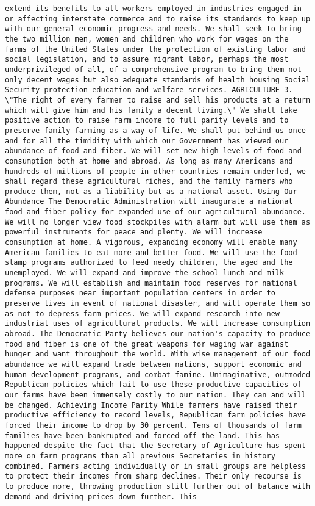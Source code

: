 \documentclass[
]{article}
\begin{document}
\begin{verbatim}
extend its benefits to all workers employed in industries engaged in or affecting interstate commerce and to raise its standards to keep up with our general economic progress and needs. We shall seek to bring the two million men, women and children who work for wages on the farms of the United States under the protection of existing labor and social legislation, and to assure migrant labor, perhaps the most underprivileged of all, of a comprehensive program to bring them not only decent wages but also adequate standards of health housing Social Security protection education and welfare services. AGRICULTURE 3. \"The right of every farmer to raise and sell his products at a return which will give him and his family a decent living.\" We shall take positive action to raise farm income to full parity levels and to preserve family farming as a way of life. We shall put behind us once and for all the timidity with which our Government has viewed our abundance of food and fiber. We will set new high levels of food and consumption both at home and abroad. As long as many Americans and hundreds of millions of people in other countries remain underfed, we shall regard these agricultural riches, and the family farmers who produce them, not as a liability but as a national asset. Using Our Abundance The Democratic Administration will inaugurate a national food and fiber policy for expanded use of our agricultural abundance. We will no longer view food stockpiles with alarm but will use them as powerful instruments for peace and plenty. We will increase consumption at home. A vigorous, expanding economy will enable many American families to eat more and better food. We will use the food stamp programs authorized to feed needy children, the aged and the unemployed. We will expand and improve the school lunch and milk programs. We will establish and maintain food reserves for national defense purposes near important population centers in order to preserve lives in event of national disaster, and will operate them so as not to depress farm prices. We will expand research into new industrial uses of agricultural products. We will increase consumption abroad. The Democratic Party believes our nation's capacity to produce food and fiber is one of the great weapons for waging war against hunger and want throughout the world. With wise management of our food abundance we will expand trade between nations, support economic and human development programs, and combat famine. Unimaginative, outmoded Republican policies which fail to use these productive capacities of our farms have been immensely costly to our nation. They can and will be changed. Achieving Income Parity While farmers have raised their productive efficiency to record levels, Republican farm policies have forced their income to drop by 30 percent. Tens of thousands of farm families have been bankrupted and forced off the land. This has happened despite the fact that the Secretary of Agriculture has spent more on farm programs than all previous Secretaries in history combined. Farmers acting individually or in small groups are helpless to protect their incomes from sharp declines. Their only recourse is to produce more, throwing production still further out of balance with demand and driving prices down further. This 
\end{verbatim}
\end{document}
